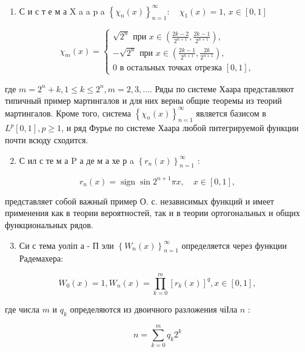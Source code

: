 \documentclass[10pt]{article}
\begin{document}
\begin{enumerate}
  \item С и с т е м а $\mathrm{X}$ a a p a $\left\{\chi_{n}(x)\right\}_{n=1}^{\infty}: \quad \chi_{1}(x)=1$, $x \in[0,1]$
\end{enumerate}

\[
\chi_{m}(x)=\left\{\begin{array}{c}
\sqrt{2^{n}} \text { при } x \in\left(\frac{2 k-2}{2^{n+1}}, \frac{2 k-1}{2^{n+1}}\right), \\
-\sqrt{2^{n}} \text { при } x \in\left(\frac{2 k-1}{2^{n+1}}, \frac{2 k}{2^{n+1}}\right), \\
0 \text { в остальных точках отрезка }[0,1],
\end{array}\right.
\]

где $m=2^{n}+k, 1 \leqslant k \leqslant 2^{n}, m=2,3, \ldots$. Ряды по системе Хаара представляют типичный пример мартингалов и для них верны общие теоремы из теорий мартингалов. Кроме того, система $\left\{\chi_{n}(x)\right\}_{n=1}^{\infty}$ является базисом в $L^{p}[0,1], p \geqslant 1$, и ряд Фурье по системе Хаара любой пнтегрируемой функции почти всюду сходится.

\begin{enumerate}
  \setcounter{enumi}{1}
  \item С ил с те м а $\mathrm{P}$ а де м а хе р a $\left\{r_{n}(x)\right\}_{n=1}^{\infty}$ :
\end{enumerate}

\[
r_{n}(x)=\operatorname{sign} \sin 2^{n+1} \pi x, \quad x \in[0,1],
\]

представляет собой важный пример О. с. независимых функций и имеет применения как в теории вероятностей, так и в теории ортогональных и общих функциональных рядов.

\begin{enumerate}
  \setcounter{enumi}{2}
  \item Си с тема уоліп а - П эли $\left\{W_{n}(x)\right\}_{n=1}^{\infty}$ определяется через функции Радемахера:
\end{enumerate}

\[
W_{0}(x)=1, W_{n}(x)=\prod_{k=0}^{m}\left[r_{k}(x)\right]^{q}, x \in[0,1],
\]

где числа $m$ и $q_{k}$ определяются из двоичного разложения чіІла $n$ :

\[
n=\sum_{k=0}^{m} q_{k} 2^{k}
\]
\end{document}
